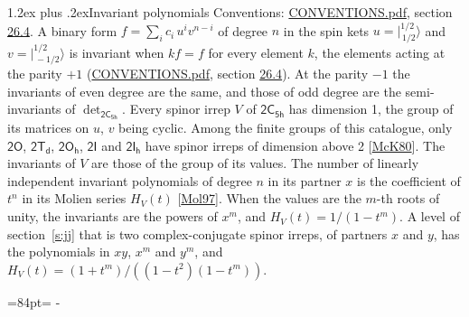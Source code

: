\documentclass[10pt,a4paper]{article}
\makeatletter
\renewcommand\section{\@startsection{section}{1}{\z@}{-3ex plus -1ex minus -.2ex}%
  {1.2ex plus .2ex}{\normalfont\large\sffamily\bfseries\color{parttitle}}}
\newcommand{\needspace}[1]{\par\penalty-100\begingroup\dimen0=#1\relax\dimen2=\pagegoal
  \advance\dimen2-\pagetotal\ifdim\dimen0>\dimen2\relax\ifdim\dimen2>0pt\vfil\break\fi\fi
  \endgroup}
\numberwithin{equation}{section}
\newcommand{\grp}[1]{\mathsf{#1}}
\newcommand{\jm}[2]{\bigl\lvert{}^{#1}_{\,#2}\bigr\rangle}
\makeatother
\begin{document}
\section{Invariant polynomials}\label{s:invariants}
Conventions: \href{../../CONVENTIONS.pdf}{CONVENTIONS.pdf}, section \href{../../CONVENTIONS.pdf\#conv.26.4}{26.4}.
\leavevmode\label{n:local.binary.form}A binary form $f = \sum_i c_i\, u^i v^{n-i}$ of degree $n$ in the spin kets $u = \jm{1/2}{1/2}$ and $v = \jm{1/2}{-1/2}$ is invariant when $k f = f$ for every element $k$, the elements acting at the parity $+1$ (\href{../../CONVENTIONS.pdf}{CONVENTIONS.pdf}, section \href{../../CONVENTIONS.pdf\#conv.26.4}{26.4}). At the parity $-1$ the invariants of even degree are the same, and those of odd degree are the semi-invariants of $\det_{\grp{2C_{5h}}}$.
\leavevmode\label{n:function.hilbert}Every spinor irrep $V$ of $\grp{2C_{5h}}$ has dimension 1, the group of its matrices on $u$, $v$ being cyclic. Among the finite groups of this catalogue, only $\grp{2O}$, $\grp{2T_{d}}$, $\grp{2O_{h}}$, $\grp{2I}$ and $\grp{2I_{h}}$ have spinor irreps of dimension above 2 [\href{../../../REFERENCES.pdf\#ref.McK80}{McK80}]. The invariants of $V$ are those of the group of its values. \label{n:local.partner.x}The number of linearly independent invariant polynomials of degree $n$ in its partner $x$ is the coefficient of $t^n$ in its Molien series $H_V(t)$ [\href{../../../REFERENCES.pdf\#ref.Mol97}{Mol97}]. When the values are the $m$-th roots of unity, the invariants are the powers of $x^{m}$, and $H_V(t) = 1/(1 - t^{m})$. A level of section~\ref{s:jj} that is two complex-conjugate spinor irreps, of partners $x$ and $y$, has the polynomials in $xy$, $x^{m}$ and $y^{m}$, and $H_V(t) = (1 + t^{m})/((1 - t^{2})(1 - t^{m}))$.
\needspace{84pt}
\end{document}

